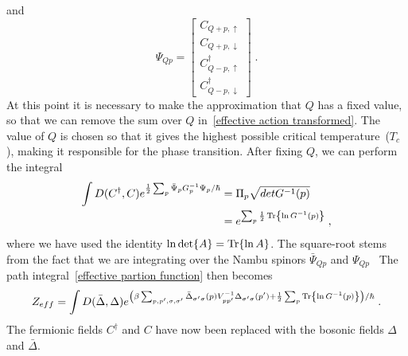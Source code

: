 \documentclass{article}
\begin{document}
and
\begin{equation}
   \Psi_{Q p} = 
\begin{bmatrix}
     C_{Q + p,\uparrow} \\
     C_{Q + p,\downarrow}  \\
     C^{\dagger}_{Q - p,\uparrow}  \\
     C^{\dagger}_{Q - p,\downarrow}
\end{bmatrix}\;.
\end{equation} 
At this point it is necessary to make the approximation that $Q$ has a fixed value, so that we can remove the sum over $Q$ in~\cref{effective action transformed}. The value of $Q$ is chosen so that it gives the highest possible critical temperature~($T_c$), making it responsible for the phase transition. After fixing $Q$, we can perform the integral  
\begin{align}
    \int D(C^{\dagger},C) e^{\frac{1}{2} \sum_{p} \bar{\Psi}_{p} G^{-1}_ {p} \Psi_{p} / \hbar} &= \Pi_p \sqrt{det{G^{-1}(p)}} \nonumber\\
                                                                                               &= e^{\sum_p \frac{1}{2}\Tr{\ln{G^{-1}(p)}}} \;\nonumber,
\end{align}
where we have used the identity $\ln{\det{A}} = \Tr{\ln{A}}$. The square-root stems from the fact that we are integrating over the Nambu spinors $\bar{\Psi}_{Q p}$ and $\Psi_{Q p}$~\cite{Wegner2016,Hugdal2019}  The path integral~\cref{effective partion function} then becomes
\begin{equation}
    Z_{eff} = \int D(\bar{\Delta}, \Delta) e^{\left(\beta\sum_{p,p',\sigma,\sigma'} \bar{\Delta}_{\sigma' \sigma}(p) V^{-1}_{p p'} \Delta_{\sigma' \sigma}(p') + \frac{1}{2} \sum_p \Tr{\ln{G^{-1}(p)}}\right) / \hbar}\;.
\end{equation}
The fermionic fields $C^{\dagger}$ and $C$ have now been replaced with the bosonic fields $\Delta$ and $\bar{\Delta}$.
\end{document}
